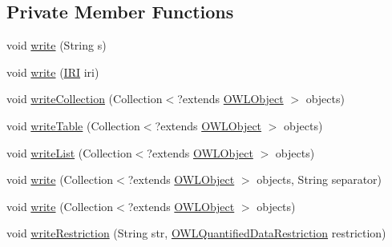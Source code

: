 \subsection*{Private Member Functions}
\begin{DoxyCompactItemize}
\item 
void \hyperlink{classuk_1_1ac_1_1manchester_1_1owl_1_1owlapi_1_1tutorial_1_1io_1_1_o_w_l_tutorial_syntax_object_renderer_a1f94a556e92f0b085a1dab6fdbd9e59d}{write} (String s)
\item 
void \hyperlink{classuk_1_1ac_1_1manchester_1_1owl_1_1owlapi_1_1tutorial_1_1io_1_1_o_w_l_tutorial_syntax_object_renderer_a2c19e17d465c7cc326587856b449c594}{write} (\hyperlink{classorg_1_1semanticweb_1_1owlapi_1_1model_1_1_i_r_i}{I\-R\-I} iri)
\item 
void \hyperlink{classuk_1_1ac_1_1manchester_1_1owl_1_1owlapi_1_1tutorial_1_1io_1_1_o_w_l_tutorial_syntax_object_renderer_ac58d2d1a817d7b683adf270d208f085f}{write\-Collection} (Collection$<$?extends \hyperlink{interfaceorg_1_1semanticweb_1_1owlapi_1_1model_1_1_o_w_l_object}{O\-W\-L\-Object} $>$ objects)
\item 
void \hyperlink{classuk_1_1ac_1_1manchester_1_1owl_1_1owlapi_1_1tutorial_1_1io_1_1_o_w_l_tutorial_syntax_object_renderer_a5b233884563aac9ceb59f396a4a565c7}{write\-Table} (Collection$<$?extends \hyperlink{interfaceorg_1_1semanticweb_1_1owlapi_1_1model_1_1_o_w_l_object}{O\-W\-L\-Object} $>$ objects)
\item 
void \hyperlink{classuk_1_1ac_1_1manchester_1_1owl_1_1owlapi_1_1tutorial_1_1io_1_1_o_w_l_tutorial_syntax_object_renderer_a487afb3629ad76ab4a31a52b600d5d9b}{write\-List} (Collection$<$?extends \hyperlink{interfaceorg_1_1semanticweb_1_1owlapi_1_1model_1_1_o_w_l_object}{O\-W\-L\-Object} $>$ objects)
\item 
void \hyperlink{classuk_1_1ac_1_1manchester_1_1owl_1_1owlapi_1_1tutorial_1_1io_1_1_o_w_l_tutorial_syntax_object_renderer_a057a07b7e165e53a71589fd561ee96a1}{write} (Collection$<$?extends \hyperlink{interfaceorg_1_1semanticweb_1_1owlapi_1_1model_1_1_o_w_l_object}{O\-W\-L\-Object} $>$ objects, String separator)
\item 
void \hyperlink{classuk_1_1ac_1_1manchester_1_1owl_1_1owlapi_1_1tutorial_1_1io_1_1_o_w_l_tutorial_syntax_object_renderer_aa4d37a12ff6eaf70c112aa55e5acb5d7}{write} (Collection$<$?extends \hyperlink{interfaceorg_1_1semanticweb_1_1owlapi_1_1model_1_1_o_w_l_object}{O\-W\-L\-Object} $>$ objects)
\item 
void \hyperlink{classuk_1_1ac_1_1manchester_1_1owl_1_1owlapi_1_1tutorial_1_1io_1_1_o_w_l_tutorial_syntax_object_renderer_aba244182d9d6fe0fe0d2afdb3cdfa52d}{write\-Restriction} (String str, \hyperlink{interfaceorg_1_1semanticweb_1_1owlapi_1_1model_1_1_o_w_l_quantified_data_restriction}{O\-W\-L\-Quantified\-Data\-Restriction} restriction)

\end{DoxyCompactItemize}
